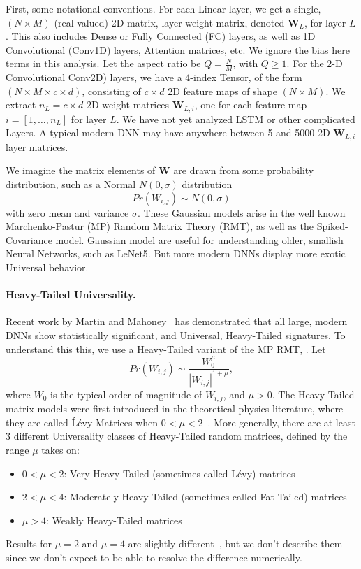 First, some notational conventions.
For each Linear layer, we get a  single, $(N\times M)$ (real valued) 2D matrix, layer weight matrix, denoted $\mathbf{W}_{L}$, for layer $L$.  
This also includes Dense or Fully Connected (FC) layers, as well as 1D Convolutional (Conv1D) layers, Attention matrices, etc.
We ignore the bias here terms in this analysis.  Let the aspect ratio be $Q=\frac{N}{M}$, with $Q\ge 1$.
For the 2-D Convolutional Conv2D) layers, we have a 4-index Tensor, of the form $(N\times M \times c\times d)$, consisting
of $c\times d$ 2D feature maps of shape $(N\times M)$.    
We  extract $n_{L}=c\times d$  2D  weight matrices $\mathbf{W}_{L,i}$, one for each feature map $i=[1,\dots,n_{L}]$ for layer $L$.
We have not yet analyzed LSTM or other complicated Layers. 
A typical modern DNN may have anywhere between 5 and 5000 2D $\mathbf{W}_{L,i}$ layer matrices.
   
We imagine the matrix elements of $\mathbf{W}$  are drawn from some probability distribution, such as a Normal $N(0,\sigma)$ distribution
$$
Pr(W_{i,j})\sim N(0,\sigma)
$$
with zero mean and variance $\sigma$.   
These Gaussian models arise in the well known Marchenko-Pastur (MP) Random Matrix Theory (RMT), as well as the Spiked-Covariance model. 
Gaussian model are useful for understanding older, smallish Neural Networks, such as LeNet5.
But more modern DNNs display more exotic Universal behavior.  


\paragraph{Heavy-Tailed Universality.} 
Recent work by Martin and Mahoney~\cite{MM18_TR} 
has demonstrated that all large, modern DNNs show statistically significant, and Universal, Heavy-Tailed signatures.  
To understand this this, we use a Heavy-Tailed variant of the MP RMT, .
Let 
$$
Pr(W_{i,j})\sim\dfrac{W_{0}^{\mu}}{|W_{i,j}|^{1+\mu}}  ,
$$
where $W_{0}$ is the typical order of magnitude of $W_{i,j}$, and $\mu>0$. 
The Heavy-Tailed matrix models were first introduced in the theoretical physics literature, where they are called \'L\'evy Matrices when $0<\mu<2$~\cite{PB94}.
More generally, there are at least 3 different Universality classes of Heavy-Tailed random matrices, defined by the range $\mu$ takes on:
\begin{itemize}
\item $0<\mu<2$: Very Heavy-Tailed (sometimes called L\'evy) matrices
\item $2<\mu<4$: Moderately Heavy-Tailed (sometimes called Fat-Tailed) matrices
\item $\mu>4$: Weakly Heavy-Tailed matrices
\end{itemize}
Results for $\mu=2$ and $\mu=4$ are slightly different~\cite{SornetteBook,BouchaudPotters03}, but we don't describe them since we don't expect to be able to resolve the difference numerically.

